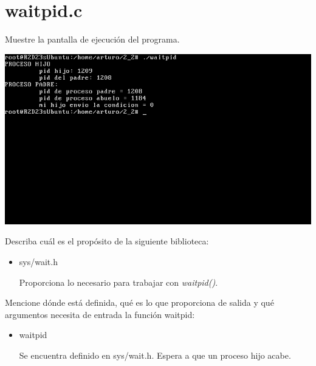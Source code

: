 \section{waitpid.c}

	Muestre la pantalla de ejecución del programa.

	\begin{center}
		\includegraphics{imagenes/waitpid.png}
	\end{center}

	Describa cuál es el propósito de la siguiente biblioteca:

	\begin{itemize}

		\item sys/wait.h
	\begin{tcolorbox}
	Proporciona lo necesario para trabajar con \textit{waitpid()}.
	\end{tcolorbox}

	\end{itemize}

	Mencione dónde está definida, qué es lo que proporciona de salida y qué argumentos necesita de entrada la función waitpid:

	\begin{itemize}

		\item waitpid
	\begin{tcolorbox}
	Se encuentra definido en sys/wait.h. Espera a que un proceso hijo acabe. 
	\end{tcolorbox}

	\end{itemize}
